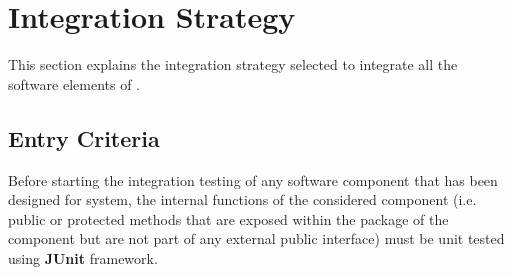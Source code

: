 \section{Integration Strategy}
This section explains the integration strategy selected to integrate all the software elements of \myTaxiService{}.

\subsection{Entry Criteria}
Before starting the integration testing of any software component that has been designed for \myTaxiService{} system, the internal functions of the considered component (i.e. public or protected methods that are exposed within the package of the component but are not part of any external public interface) must be unit tested using \textbf{JUnit} framework.

